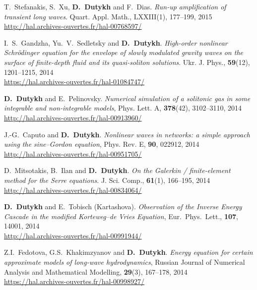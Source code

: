 \begin{etaremune}
  \item T.~Stefanakis, S.~Xu, \textbf{D.~Dutykh} and F.~Dias. \textit{Run-up amplification of transient long waves}. Quart. Appl. Math., LXXIII(1), 177--199, 2015 \\ %
  \url{http://hal.archives-ouvertes.fr/hal-00768597/}


  \item I.~S.~Gandzha, Yu.~V.~Sedletsky and \textbf{D.~Dutykh}. \textit{High-order nonlinear Schr\"odinger equation for the envelope of slowly modulated gravity waves on the surface of finite-depth fluid and its quasi-soliton solutions}. Ukr. J. Phys., \textbf{59}(12), 1201--1215, 2014 \\ %
  \url{https://hal.archives-ouvertes.fr/hal-01084747/}
  
  \item \textbf{D.~Dutykh} and E.~Pelinovsky. \textit{Numerical simulation of a solitonic gas in some integrable and non-integrable models}, Phys. Lett. A, \textbf{378}(42), 3102--3110, 2014 \\ %
  \url{http://hal.archives-ouvertes.fr/hal-00913960/}
  
  \item J.-G.~Caputo and \textbf{D.~Dutykh}. \textit{Nonlinear waves in networks: a simple approach using the sine--Gordon equation}, Phys. Rev. E, \textbf{90}, 022912, 2014 \\ %
  \url{http://hal.archives-ouvertes.fr/hal-00951705/}
  
  \item D.~Mitsotakis, B.~Ilan and \textbf{D.~Dutykh}. \textit{On the Galerkin / finite-element method for the Serre equations}. J. Sci. Comp., \textbf{61}(1), 166--195, 2014 \\ %
  \url{http://hal.archives-ouvertes.fr/hal-00834064/}
  
  \item \textbf{D.~Dutykh} and E.~Tobisch (Kartashova). \textit{Observation of the Inverse Energy Cascade in the modified Korteweg--de Vries Equation}, Eur.~Phys.~Lett., \textbf{107}, 14001, 2014 \\ %
  \url{http://hal.archives-ouvertes.fr/hal-00991944/}
  
  \item Z.I.~Fedotova, G.S.~Khakimzyanov and \textbf{D.~Dutykh}. \textit{Energy equation for certain approximate models of long-wave hydrodynamics}, Russian Journal of Numerical Analysis and Mathematical Modelling, \textbf{29}(3), 167--178, 2014 \\ %
  \url{https://hal.archives-ouvertes.fr/hal-00998927/}
  

\end{etaremune}
